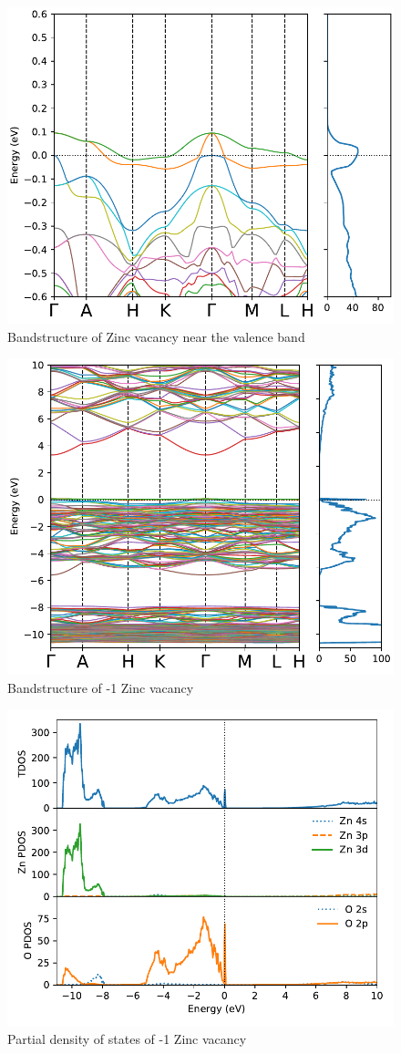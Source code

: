 \begin{figure}[tbh!]
	\centering
	\includegraphics[width=0.6\linewidth]{"images/rnd/band-dos-close_Zn_vac"}
	\caption[Bandstructure of Zinc vacancy near the valence band]{Bandstructure of Zinc vacancy near the valence band}
	\label{fig:band-dos-close_Zn_vac}
\end{figure}

\begin{figure}[tbh!]
	\centering
	\includegraphics[width=0.6\linewidth]{"images/rnd/band-dos_Zn_vac-n1"}
	\caption[Bandstructure of -1 Zinc vacancy]{Bandstructure of -1 Zinc vacancy}
	\label{fig:band-dos_Zn_vac-n1}
\end{figure}

\begin{figure}[tbh!]
	\centering
	\includegraphics[width=0.6\linewidth]{"images/rnd/dos-pdos_Zn_vac-n1"}
	\caption[Partial density of states of -1 Zinc vacancy]{Partial density of states of -1 Zinc vacancy}
	\label{fig:dos-pdos_Zn_vac-n1}
\end{figure}

